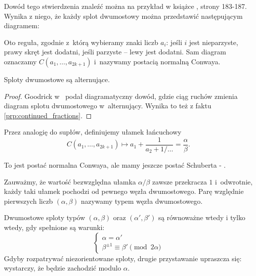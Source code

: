 Dowód tego stwierdzenia znaleźć można na przykład w książce \cite{murasugi96}, strony 183-187.
Wynika z niego, że każdy splot dwumostowy można przedstawić następującym diagramem:


Oto reguła, zgodnie z~którą wybieramy znaki liczb $a_i$:
jeśli $i$ jest nieparzyste, prawy skręt jest dodatni, jeśli parzyste -- lewy jest dodatni.
Sam diagram oznaczamy $C(a_1, \ldots, a_{2k+1})$ i~nazywamy postacią normalną Conwaya.


\begin{proposition}
    Sploty dwumostowe są alternujące.
\end{proposition}

\begin{proof}
    Goodrick w~\cite{goodrick72} podał diagramatyczny dowód, gdzie ciąg ruchów zmienia diagram splotu dwumostowego w~alternujący.
    Wynika to też z faktu \ref{prp:continued_fractions}.
\end{proof}

Przez analogię do supłów, definiujemy ułamek łańcuchowy
\begin{equation}
    C(a_1, \ldots, a_{2k+1}) \mapsto a_1 + \frac{1}{a_2 + 1/\ldots} = \frac \alpha \beta.
\end{equation}

\begin{tobedone}
%
%
    To jest postać normalna Conwaya, ale mamy jeszcze postać Schuberta - \cite[s. 21]{kawauchi96}.
\end{tobedone}

Zauważmy, że wartość bezwzględna ułamka $\alpha/\beta$ zawsze przekracza $1$ i~odwrotnie, każdy taki ułamek pochodzi od pewnego węzła dwumostowego.
Parę względnie pierwszych liczb $(\alpha, \beta)$ nazywamy typem węzła dwumostowego.

\begin{proposition}
    \label{prp:tangle_equivalence}
    Dwumostowe sploty typów $(\alpha, \beta)$ oraz $(\alpha', \beta')$ są równoważne wtedy i tylko wtedy, gdy spełnione są warunki:
    \begin{equation}
        \begin{cases}
            \alpha = \alpha' \\
            \beta^{\pm 1} \equiv \beta' \pmod {2 \alpha}
        \end{cases}
    \end{equation}
    Gdyby rozpatrywać niezorientowane sploty, drugie przystawanie upraszcza się: wystarczy, że będzie zachodzić modulo $\alpha$.
\end{proposition}

